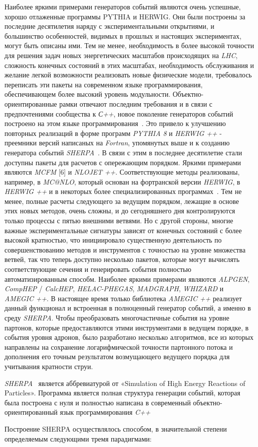 Наиболее яркими примерами генераторов событий являются очень успешные, хорошо отлаженные программы
PYTHIA и HERWIG. Они были построены за последние десятилетия наряду с экспериментальными открытиями, и большинство особенностей, видимых в прошлых и настоящих экспериментах, могут быть описаны
ими. Тем не менее, необходимость в более высокой точности для решения задач новых энергетических масштабов происходящих
на \textit{LHC}, сложность конечных состояний в этих масштабах, необходимость обслуживания и желание легкой возможности реализовать новые физические модели, требовалось переписать эти пакеты на современном языке программирования, обеспечивающем более высокий уровень модульности. Объектно-ориентированные рамки отвечают последним
требования и в связи с предпочтениями сообщества к \textit{С++}, новое поколение генераторов событий
построено на этом языке программирования~\cite{review-sherpa}. Это привело к улучшению повторных реализаций в форме
программ \textit{PYTHIA 8} и \textit{HERWIG ++} - преемники версий написаных на \textit{Fortran}, упомянутых выше
и к созданию генератора событий \textit{SHERPA}~\cite{review-sherpa}.
В связи с этим в последнее десятилетие стали доступны пакеты для расчетов с опережающим порядком. Яркими примерами являются \textit{MCFM} [6] и \textit{NLOJET ++}. Соответствующие методы реализованы, например, в \textit{MC@NLO}, который основан
на фортранской версии \textit{HERWIG}, в \textit{HERWIG ++} и в некоторых более специализированных программах~\cite{review-sherpa}.
Тем не менее, полные расчеты следующего за ведущим порядком, лежащие в основе этих новых методов, очень сложны, и до сегодняшнего дня контролируются только процессы с пятью внешними ветвями. Но
с другой стороны, многие важные экспериментальные сигнатуры зависят от конечных состояний с более высокой кратностью, что
инициировало существенную деятельность по совершенствованию методов и инструментов с точностью на уровне множества ветвей, так что
теперь доступно несколько пакетов, которые могут вычислять соответствующие сечения и генерировать события
полностью автоматизированным способм. Наиболее яркими примерами являются \textit{ALPGEN}, \textit{CompHEP} / \textit{CalcHEP},
\textit{HELAC-PHEGAS}, \textit{MADGRAPH}, \textit{WHIZARD} и \textit{AMEGIC ++}. В настоящее время только библиотека \textit{AMEGIC ++} реализует данный функционал и встроенная в полноценный генератор событий, а именно в среду \textit{SHERPA}. Чтобы
преобразовать многочастичные события на уровне партонов, которые предоставляются этими инструментами в ведущем порядке, в
события уровня адронов, было разработано несколько алгоритмов, все из которых направлены на сохранение логарифмической
точности партонного потока и дополнения его точным результатом возмущающего ведущего порядка для
учитывания кратности струи.

\textit{SHERPA}~\cite{review-sherpa} является аббревиатурой от «Simulation of High Energy Reactions of Particles». Программа является
полная структура генерации событий, которая была построена с нуля и полностью написана в
современный объектно-ориентированный язык программирования \textit{C++}

Построение SHERPA осуществлялось способом, в значительной степени определяемым следующими тремя парадигмами:



